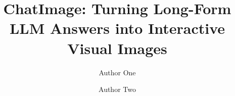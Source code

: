 \documentclass[numbers]{april_aigc}
\title{ChatImage: Turning Long-Form LLM Answers into Interactive Visual Images}
\author[1,*]{Author One}
\author[1,\dagger]{Author Two}
\affiliation[1]{Affiliation TBD}
\newif\ifshowtoc
\begin{document}
\maketitle
\thispagestyle{plain}

\ifshowtoc
  \clearpage
  \setcounter{tocdepth}{2}
  \tableofcontents
  \vspace{1cm}
  \clearpage
\fi







\begingroup
\renewcommand{\bibfont}{\scriptsize}
\setlength{\bibsep}{0pt}

\endgroup
\end{document}

